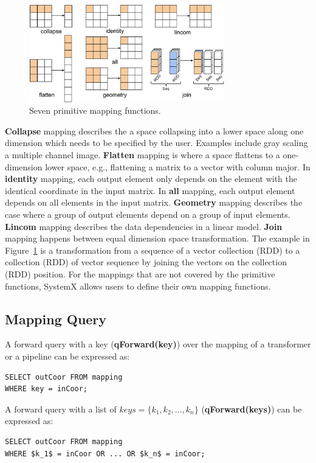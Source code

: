 \documentclass{sig-alternate}
\begin{document}
\begin{figure}[t]
\begin{center}
    \includegraphics[width=85mm]{pictures/narrowmapping}
\caption {Seven primitive mapping functions.
    \label{fig:narrowmapping}
}
\end{center}
\end{figure}

{\bf Collapse} mapping describes the a space collapsing into a lower space along one dimension which needs
to be specified by the user. Examples include gray scaling a multiple channel image.
{\bf Flatten} mapping is where a space flattens to a one-dimension lower space, e.g., flattening a matrix to a vector with column major.
In {\bf identity} mapping, each output element only depends on the element with the identical coordinate in the input matrix.
In {\bf all} mapping, each output element depends on all elements in the input matrix.
{\bf Geometry} mapping describes the case where a group of output elements depend on a group of input elements.
{\bf Lincom} mapping describes the data dependencies in a linear model.
{\bf Join} mapping happens between equal dimension space transformation. The example in Figure~\ref{fig:narrowmapping} 
is a transformation from a sequence of a vector collection (RDD) to a collection (RDD) of vector sequence by joining the vectors
on the collection (RDD) position.
For the mappings that are not covered by the primitive functions, SystemX allows users to define their own mapping functions.

\subsection{Mapping Query}
A forward query with a key  ({\bf qForward(key)}) over the mapping of a transformer or a pipeline can be expressed as:
\begin{lstlisting}
SELECT outCoor FROM mapping
WHERE key = inCoor;
\end{lstlisting}

A forward query with a list of $keys=\{k_1, k_2, ..., k_n\}$ ({\bf qForward(keys)}) can be expressed as:
\begin{lstlisting}
SELECT outCoor FROM mapping
WHERE $k_1$ = inCoor OR ... OR $k_n$ = inCoor;
\end{lstlisting}
\end{document}
